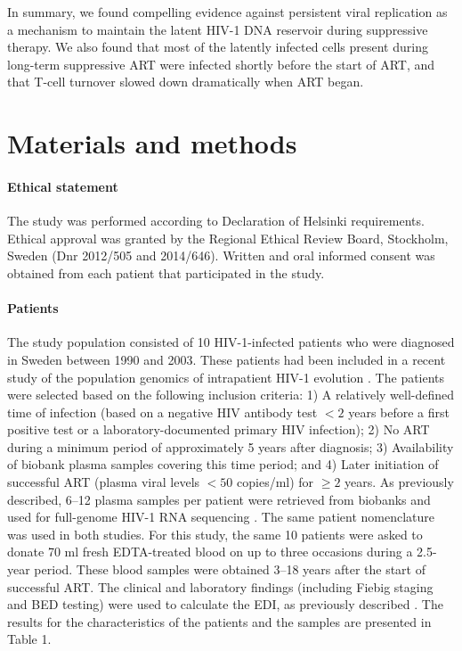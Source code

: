 \documentclass[aps,rmp,onecolumn,linenumbers]{revtex4-1}
\begin{document}
In summary, we found compelling evidence against persistent viral replication as a mechanism to maintain the latent HIV-1 DNA reservoir during suppressive therapy. We also found that most of the latently infected cells present during long-term suppressive ART were infected shortly before the start of ART, and that T-cell turnover slowed down dramatically when ART began.

\section*{Materials and methods}

\paragraph*{Ethical statement}
The study was performed according to Declaration of Helsinki requirements. Ethical approval was granted by the Regional Ethical Review Board, Stockholm, Sweden (Dnr 2012/505 and 2014/646). Written and oral informed consent was obtained from each patient that participated in the study.

\paragraph*{Patients}
The study population consisted of 10 HIV-1-infected patients who were diagnosed in Sweden between 1990 and 2003. These patients had been included in a recent study of the population genomics of intrapatient HIV-1 evolution \cite{zanini_population_2016}. The patients were selected based on the following inclusion criteria: 1) A relatively well-defined time of infection (based on a negative HIV antibody test $<2$ years before a first positive test or a laboratory-documented primary HIV infection); 2) No ART during a minimum period of approximately 5 years after diagnosis; 3) Availability of biobank plasma samples covering this time period; and 4) Later initiation of successful ART (plasma viral levels $<50$ copies/ml) for $≥2$ years. As previously described, 6--12 plasma samples per patient were retrieved from biobanks and used for full-genome HIV-1 RNA sequencing \cite{zanini_population_2016}. The same patient nomenclature was used in both studies. For this study, the same 10 patients were asked to donate 70 ml fresh EDTA-treated blood on up to three occasions during a 2.5-year period. These blood samples were obtained 3--18 years after the start of successful ART. The clinical and laboratory findings (including Fiebig staging and BED testing) were used to calculate the EDI, as previously described \cite{zanini_population_2016}. The results for the characteristics of the patients and the samples are presented in Table 1. 
\end{document}
